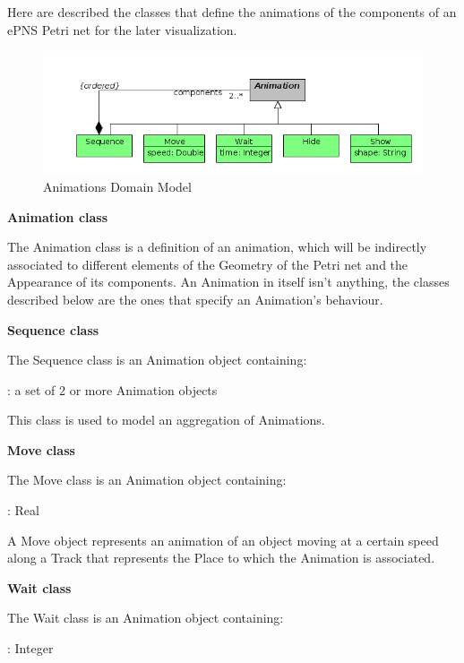 Here are described the classes that define the animations of the
components of an ePNS Petri net for the later visualization.

\begin{figure}[ht]
   \begin{center}
       \includegraphics[scale=0.50]{image/dm_animation.png}
       \caption{Animations Domain Model}
       \label{fig:animation_domain_model}
   \end{center}
\end{figure}
  
\textbf{Animation class}

The Animation class is a definition of an animation, which will be indirectly associated to different elements of the Geometry of the Petri net and the Appearance of its components. An Animation in itself isn't anything, the classes described below are the ones that specify an Animation's behaviour.

\textbf{Sequence class}

The Sequence class is an Animation object containing:
\begin{description}[labelindent=1cm]
  \item[components]: a set of 2 or more Animation objects
\end{description}

This class is used to model an aggregation of Animations.

\textbf{Move class}

The Move class is an Animation object containing:
\begin{description}[labelindent=1cm]
  \item[speed]: Real
\end{description}

A Move object represents an animation of an object moving at a certain speed along a Track that represents the Place to which the Animation is associated.

\textbf{Wait class}

The Wait class is an Animation object containing:
\begin{description}[labelindent=1cm]
  \item[time]: Integer
\end{description}

